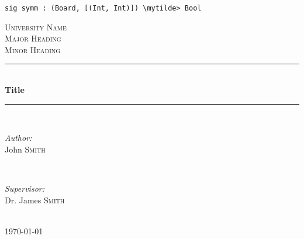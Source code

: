 \documentclass[12pt]{article} %
\begin{document}

\newcommand{\mytilde}{$\sim$}
\begin{Verbatim}[commandchars=\\\{\}]
sig symm : (Board, [(Int, Int)]) \mytilde> Bool
\end{Verbatim}


\begin{titlepage}

\newcommand{\HRule}{\rule{\linewidth}{0.5mm}} %

\center %

\textsc{\LARGE University Name}\\[1.5cm] %
\textsc{\Large Major Heading}\\[0.5cm] %
\textsc{\large Minor Heading}\\[0.5cm] %

\HRule \\[0.4cm]
{ \huge \bfseries Title}\\[0.4cm] %
\HRule \\[1.5cm]

\begin{minipage}{0.4\textwidth}
\begin{flushleft} \large
\emph{Author:}\\
John \textsc{Smith} %
\end{flushleft}
\end{minipage}
~
\begin{minipage}{0.4\textwidth}
\begin{flushright} \large
\emph{Supervisor:} \\
Dr. James \textsc{Smith} %
\end{flushright}
\end{minipage}\\[4cm]

{\large \today}\\[3cm] %


\vfill %

\end{titlepage}
\end{document}
